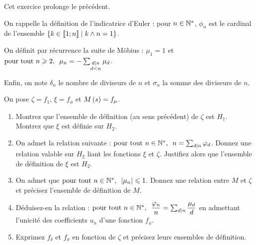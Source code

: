 \begin{exoss}[Exercice 30]
Cet exercice prolonge le précédent.

On rappelle la définition de l'indicatrice d'Euler : pour \(n\in\mathbb{N}^*\), \(\phi_n\) est le cardinal de l'ensemble \(\left\lbrace k\in\left\llbracket1;n\right\rrbracket\;\middle|\; k\land n=1\right\rbrace\).

On définit par récurrence la suite de Möbius : \(\mu_1=1\) et \(\quantifs{\tpt n\geq2}\mu_n=-\sum_{\substack{d\divise n \\ d<n}}\mu_d\).

Enfin, on note \(\delta_n\) le nombre de diviseurs de \(n\) et \(\sigma_n\) la somme des diviseurs de \(n\).

On pose \(\zeta=f_1\), \(\xi=f_\phi\) et \(M\left(s\right)=f_\mu\).

\begin{enumerate}
    \item Montrez que l'ensemble de définition (au sens précédent) de \(\zeta\) est \(H_1\). Montrez que \(\xi\) est définie sur \(H_2\). \\
    \item On admet la relation suivante : \(\quantifs{\tpt n\in\Ns}n=\sum_{d\divise n}\phi_d\). Donnez une relation valable sur \(H_2\) liant les fonctions \(\xi\) et \(\zeta\). Justifiez alors que l'ensemble de définition de \(\xi\) est \(H_2\). \\
    \item On admet que \(\quantifs{\tpt n\in\Ns}\abs{\mu_n}\leq1\). Donnez une relation entre \(M\) et \(\zeta\) et précisez l'ensemble de définition de \(M\). \\
    \item Déduisez-en la relation : \(\quantifs{\tpt n\in\Ns}\dfrac{\phi_n}{n}=\sum_{d\divise n}\dfrac{\mu_d}{d}\) en admettant l'unicité des coefficients \(u_n\) d'une fonction \(f_u\). \\
    \item Exprimez \(f_\delta\) et \(f_\sigma\) en fonction de \(\zeta\) et précisez leurs ensembles de définition.
\end{enumerate}
\end{exoss}



